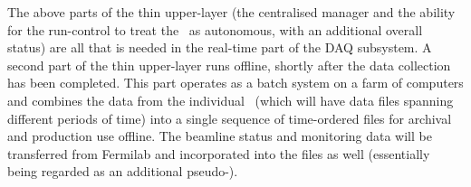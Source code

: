 The above parts of the thin upper-layer (the centralised manager and
the ability for the run-control to treat the \COMPARTMENTS\ as
autonomous, with an additional overall status) are all that is needed
in the real-time part of the DAQ subsystem.  A second part of the thin
upper-layer runs offline, shortly after the data collection has been
completed.  This part operates as a batch system on a farm of
computers and combines the data from the individual \COMPARTMENTS\
(which will have data files spanning different periods of time) into
a single sequence of time-ordered files for archival and production
use offline.  The beamline status and monitoring data will be
transferred from Fermilab and incorporated into the files as well
(essentially being regarded as an additional pseudo-\COMPARTMENT).
